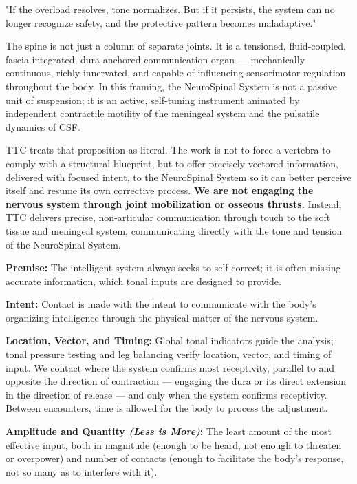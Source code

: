 \documentclass[11pt,letterpaper]{article}
\begin{document}
\begin{pullquotebox}
"If the overload resolves, tone normalizes. But if it persists, the system can no longer recognize safety, and the protective pattern becomes maladaptive."
\end{pullquotebox}

The spine is not just a column of separate joints. It is a tensioned, fluid-coupled, fascia-integrated, dura-anchored communication organ — mechanically continuous, richly innervated, and capable of influencing sensorimotor regulation throughout the body. In this framing, the NeuroSpinal System is not a passive unit of suspension; it is an active, self-tuning instrument animated by independent contractile motility of the meningeal system and the pulsatile dynamics of CSF.


TTC treats that proposition as literal. The work is not to force a vertebra to comply with a structural blueprint, but to offer precisely vectored information, delivered with focused intent, to the NeuroSpinal System so it can better perceive itself and resume its own corrective process. \textbf{We are not engaging the nervous system through joint mobilization or osseous thrusts.} Instead, TTC delivers precise, non-articular communication through touch to the soft tissue and meningeal system, communicating directly with the tone and tension of the NeuroSpinal System.


\textbf{Premise:} The intelligent system always seeks to self-correct; it is often missing accurate information, which tonal inputs are designed to provide.


\textbf{Intent:} Contact is made with the intent to communicate with the body's organizing intelligence through the physical matter of the nervous system.


\textbf{Location, Vector, and Timing:} Global tonal indicators guide the analysis; tonal pressure testing and leg balancing verify location, vector, and timing of input. We contact where the system confirms most receptivity, parallel to and opposite the direction of contraction — engaging the dura or its direct extension in the direction of release — and only when the system confirms receptivity. Between encounters, time is allowed for the body to process the adjustment.


\textbf{Amplitude and Quantity \textit{(Less is More)}:} The least amount of the most effective input, both in magnitude (enough to be heard, not enough to threaten or overpower) and number of contacts (enough to facilitate the body's response, not so many as to interfere with it).
\end{document}

